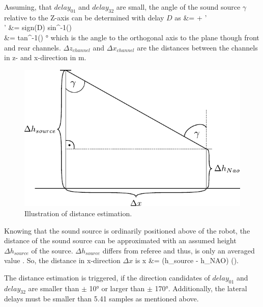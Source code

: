 Assuming, that $delay_{01}$ and $delay_{32}$ are small,
the angle of the sound source $\gamma$ relative
to the Z-axis can be determined with delay $D$ as
\bsub \bal
\gamma &= \alpha + \gamma'\\
\gamma' &= sign(D) \cdot sin^{-1}\left(\right)\\
\alpha &= tan^{-1}\left(\right) \si{\degree}
\eal \esub
which is the angle to the orthogonal axis to  the plane though
front and rear channels.
$\Delta z_{channel}$ and $\Delta x_{channel}$ are the distances between the channels
in z- and x-direction in \si{\meter}.
\begin{figure}[ht]
	\centering
		\includegraphics[width=0.6\columnwidth]{figures/x_distance}
	\caption{Illustration of distance estimation.}
    \label{fig:02_xDistance}
\end{figure}

Knowing that the sound source is ordinarily positioned above of the robot, the distance
of the sound source can be approximated with an assumed height $\Delta h_{source}$
of the source. $\Delta h_{source}$ differs from referee  and thus, is only
an averaged value .
So, the distance in x-direction $\Delta x$ is
\bal
\Delta x &= (\Delta h_{source} - \Delta h_{NAO}) \cdot \tan(\gamma).
\label{eq:02_deltaX}
\eal

The distance estimation is triggered, if the direction candidates of
$delay_{01}$ and $delay_{32}$ are smaller than $\pm$ 10\si{\degree}
or larger than $\pm$ 170\si{\degree}.
Additionally, the lateral delays must be smaller than 5.41 samples as mentioned above.

